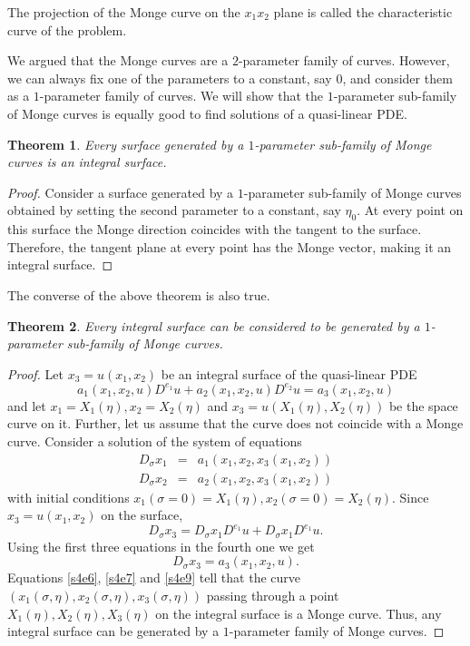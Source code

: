 \documentclass{article}
\theoremstyle{plain}
\newtheorem{thm}{Theorem}
\numberwithin{thm}{section}
\theoremstyle{plain}
\numberwithin{prop}{section}
\theoremstyle{definition}
\numberwithin{defn}{section}
\theoremstyle{remark}
\numberwithin{equation}{section}
\begin{document}
The projection of the Monge curve on the $x_1x_2$ plane is called the characteristic curve of the
problem.

We argued that the Monge curves are a $2$-parameter family of curves. However, we can always fix
one of the parameters to a constant, say $0$, and consider them as a $1$-parameter family of
curves. We will show that the $1$-parameter sub-family of Monge curves is equally good to find 
solutions of a quasi-linear PDE.
\begin{thm}\label{s4t1}
Every surface generated by a $1$-parameter sub-family of Monge curves is an integral surface.
\end{thm}
\begin{proof}
Consider a surface generated by a $1$-parameter sub-family of Monge curves obtained by setting the 
second parameter to a constant, say $\eta_0$. At every point on this surface the Monge direction 
coincides with the tangent to the surface. Therefore, the tangent plane at every point has the
Monge vector, making it an integral surface.
\end{proof}

The converse of the above theorem is also true.
\begin{thm}\label{s4t2}
Every integral surface can be considered to be generated by a $1$-parameter sub-family of Monge
curves.
\end{thm}
\begin{proof}
Let $x_3 = u(x_1, x_2)$ be an integral surface of the quasi-linear PDE
\begin{equation}\label{s4e5}
a_1(x_1, x_2, u)D^{e_1}u + a_2(x_1, x_2, u)D^{e_2}u = a_3(x_1, x_2, u)
\end{equation}
and let $x_1 = X_1(\eta), x_2 = X_2(\eta)$ and
$x_3 = u(X_1(\eta), X_2(\eta))$ be the space curve on it. Further, let us assume that the curve does 
not coincide with a Monge curve. Consider a solution of the system of equations
\begin{eqnarray*}
D_\sigma x_1 &=& a_1(x_1, x_2, x_3(x_1, x_2)) \label{s4e6} \\
D_\sigma x_2 &=& a_2(x_1, x_2, x_3(x_1, x_2)) \label{s4e7}
\end{eqnarray*}
with initial conditions $x_1(\sigma = 0) = X_1(\eta), x_2(\sigma = 0) = X_2(\eta)$. Since $x_3 = 
u(x_1, x_2)$ on the surface,
\begin{equation}\label{s4e8}
D_\sigma x_3 = D_\sigma x_1D^{e_1}u + D_\sigma x_1D^{e_1}u.
\end{equation}
Using the first three equations in the fourth one we get
\begin{equation}\label{s4e9}
D_\sigma x_3 = a_3(x_1, x_2, u).
\end{equation}
Equations \eqref{s4e6}, \eqref{s4e7} and \eqref{s4e9} tell that the curve $(x_1(\sigma, \eta), 
x_2(\sigma, \eta), x_3(\sigma, \eta))$ passing through a point $X_1(\eta), X_2(\eta), X_3(\eta)$ on the 
integral surface is a Monge curve. Thus, any integral surface can be generated by a $1$-parameter
family of Monge curves.
\end{proof}
\end{document}

